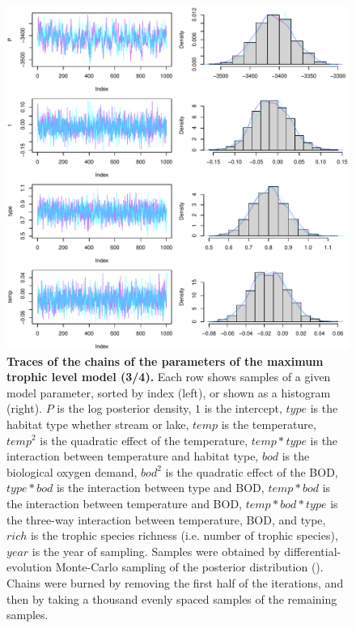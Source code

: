 \documentclass[11pt, oneside]{article}
\begin{document}
\begin{figure}[H]
\begin{center}
\includegraphics[page=3, width=1\linewidth]{b0_6_2/out_mTL/fig_tracePlot_beta.pdf}
\caption{
    \textbf{Traces of the chains of the parameters of the maximum trophic level model (3/4).}
    Each row shows samples of a given model parameter, sorted by index (left), or shown as a histogram (right).
    $P$ is the log posterior density, $1$ is the intercept, $type$ is the habitat type whether stream or lake, $temp$ is the temperature, $temp^2$ is the quadratic effect of the temperature, $temp * type$ is the interaction between temperature and habitat type, $bod$ is the biological oxygen demand, $bod^2$ is the quadratic effect of the BOD, $type * bod$ is the interaction between type and BOD, $temp * bod$ is the interaction between temperature and BOD, $temp * bod * type$ is the three-way interaction between temperature, BOD, and type, $rich$ is the trophic species richness (i.e. number of trophic species), $year$ is the year of sampling.
    Samples were obtained by differential-evolution Monte-Carlo sampling of the posterior distribution (\cite{TerBraak2006}).
    Chains were burned by removing the first half of the iterations, and then by taking a thousand evenly spaced samples of the remaining samples.
}
\end{center}
\end{figure}
\end{document}
